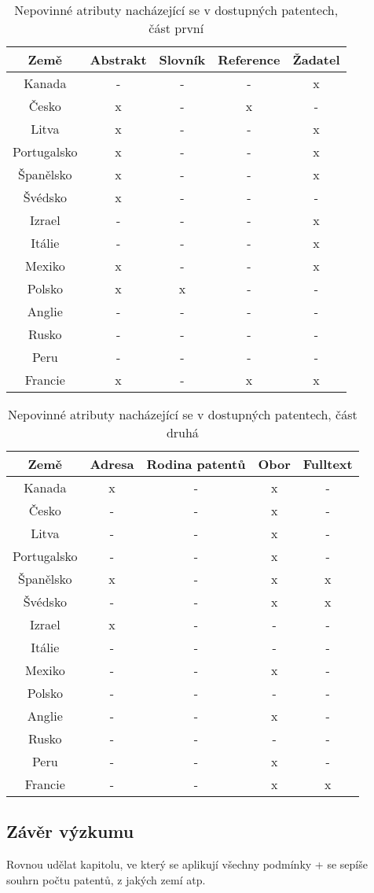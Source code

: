 	\begin{table}[h!]
	\centering
	\begin{tabular}{|c|c|c|c|c|} 
	\hline
	\textbf{Země}    & \textbf{Abstrakt} & \textbf{Slovník} & \textbf{Reference} & \textbf{Žadatel} \\
	\hline
	Kanada & - & - & - & x \\
	\hline
	Česko & x & - & x & - \\
	\hline
	Litva & x & - & - & x \\
	\hline
	Portugalsko & x & - & - & x \\
	\hline
	Španělsko & x & - & - & x \\
	\hline
	Švédsko & x & - & - & - \\
	\hline
	Izrael & - & - & - & x \\
	\hline
	Itálie & - & - & - & x \\
	\hline
	Mexiko & x & - & - & x \\
	\hline
	Polsko & x & x & - & - \\
	\hline
	Anglie & - & - & - & - \\
	\hline
	Rusko & - & - & - & - \\
	\hline
	Peru & - & - & - & - \\
	\hline
	Francie & x & - & x & x \\
	\hline
	\end{tabular}
	\caption{Nepovinné atributy nacházející se v dostupných patentech, část první}
	\label{tab:table_attributes_notcrit1}
	\end{table}

	\begin{table}[h!]
	\centering
	\begin{tabular}{|c|c|c|c|c|} 
	\hline
	\textbf{Země}    &  \textbf{Adresa} & \textbf{Rodina patentů} & \textbf{Obor} & \textbf{Fulltext} \\
	\hline
	Kanada & x & - & x & - \\
	\hline
	Česko & - & - & x & - \\
	\hline
	Litva & - & - & x & - \\
	\hline
	Portugalsko & - & - & x & - \\
	\hline
	Španělsko & x & - & x & x \\
	\hline
	Švédsko & - & - & x & x \\
	\hline
	Izrael & x & - & - & - \\
	\hline
	Itálie & - & - & - & - \\
	\hline
	Mexiko & - & - & x & - \\
	\hline
	Polsko & - & - & - & - \\
	\hline
	Anglie & - & - & x & - \\
	\hline
	Rusko & - & - & - & - \\
	\hline
	Peru & - & - & x & - \\
	\hline
	Francie & - & - & x & x \\
	\hline
	\end{tabular}
	\caption{Nepovinné atributy nacházející se v dostupných patentech, část druhá}
	\label{tab:table_attributes_notcrit2}
	\end{table}


\subsection{Závěr výzkumu}
Rovnou udělat kapitolu, ve který se aplikují všechny podmínky + se sepíše souhrn počtu patentů, z jakých zemí atp.
